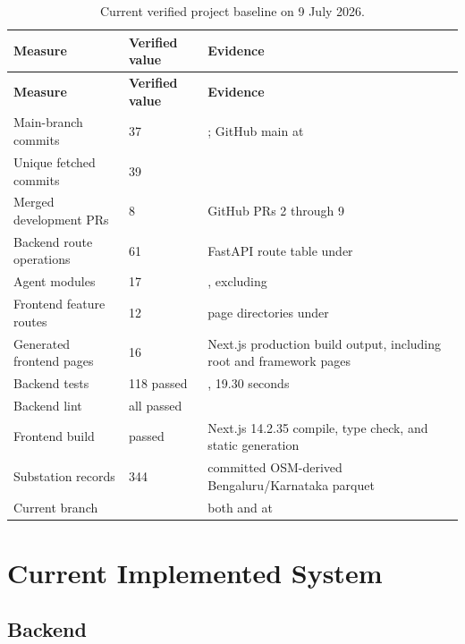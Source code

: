 \documentclass[10pt,a4paper]{article}
\begin{document}
\begin{longtable}{@{}L{4.2cm}L{3.0cm}L{7.4cm}@{}}
\caption{Current verified project baseline on 9 July 2026.}\label{tab:verifiedtotals}\\
\toprule
\textbf{Measure} & \textbf{Verified value} & \textbf{Evidence}\\
\midrule
\endfirsthead
\toprule
\textbf{Measure} & \textbf{Verified value} & \textbf{Evidence}\\
\midrule
\endhead
\bottomrule
\endfoot
Main-branch commits & 37 & ; GitHub main at \\
Unique fetched commits & 39 & \\
Merged development PRs & 8 & GitHub PRs 2 through 9\\
Backend route operations & 61 & FastAPI route table under \\
Agent modules & 17 & , excluding \\
Frontend feature routes & 12 & page directories under \\
Generated frontend pages & 16 & Next.js production build output, including root and framework pages\\
Backend tests & 118 passed & , 19.30 seconds\\
Backend lint & all passed & \\
Frontend build & passed & Next.js 14.2.35 compile, type check, and static generation\\
Substation records & 344 & committed OSM-derived Bengaluru/Karnataka parquet\\
Current branch &  & both  and  at \\
\end{longtable}

\section{Current Implemented System}

\subsection{Backend}
\end{document}
